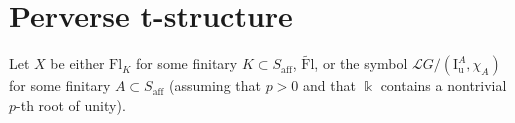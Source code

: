 \documentclass[11pt]{amsart}
\numberwithin{equation}{section}
\theoremstyle{plain}
\newtheorem{lem}[thm]{Lemma}
\theoremstyle{definition}
\newcommand{\F}{{\mathbb F}}
\newcommand{\I}{{\mathrm I}}
\renewcommand{\k}{\Bbbk}
\newcommand{\K}{{\mathbb K}}
\newcommand{\sL}{{\mathcal L}}
\newcommand{\sW}{{\mathcal W}}
\newcommand{\X}{{\mathbb X}}
\newcommand{\Xd}{\check{\X}}
\newcommand{\semi}{{{\frac{\infty}{2}}}}
\newcommand{\quar}{{{\frac{\infty}{4}}}}
\newcommand{\Av}{\mathrm{Av}}
\newcommand{\ex}{\mathrm{ext}}
\newcommand{\af}{\mathrm{aff}}
\newcommand{\Fl}{\mathrm{Fl}}
\newcommand{\tFl}{\widetilde{\Fl}}
\newcommand{\Iu}{\mathrm{I}_{\mathrm{u}}}
\newcommand{\comp}{\mathrm{c}}
\begin{document}

%

\section{Perverse t-structure} 
\label{sec:perv}

Let $X$ be either $\Fl_K$ for some finitary $K \subset S_\af$, $\tFl$, or the symbol $\sL G/(\Iu^A,\chi_A)$ for some finitary $A \subset S_\af$ (assuming that $p>0$ and that $\k$ contains a nontrivial $p$-th root of unity).
\end{document}
